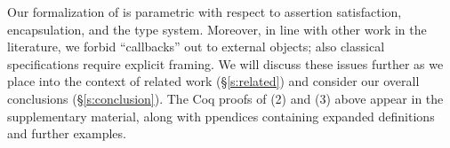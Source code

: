 Our formalization of \Nec %
{  is 
parametric} with respect to assertion
satisfaction, encapsulation, and the type system.
{{Moreover, in line} with other work in the literature,} we forbid 
``callbacks'' out to external objects; also %
classical specifications require explicit framing.
We will discuss these  issues %
further as we place \Nec into the context of 
related work (\S\ref{s:related}) and consider our overall conclusions
(\S\ref{s:conclusion}). 
%
The Coq proofs of 
(2) and (3) above appear in the
supplementary material, along with ppendices containing expanded 
definitions and further examples.


